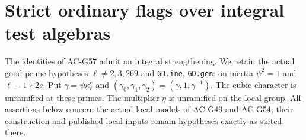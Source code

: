\section{Strict ordinary flags over integral test algebras}
\label{sec:cubic-integral-ordinary}

The identities of AC-G57 admit an integral strengthening.  We
retain the actual good-prime hypotheses $\ell\ne2,3,269$ and
\texttt{GD.ine}, \texttt{GD.gen}: on inertia $\psi^2=1$ and
$\ell-1\nmid2e$.  Put $\gamma=\psi\kappa_\ell^e$ and
$(\gamma_0,\gamma_1,\gamma_2)=(\gamma,1,\gamma^{-1})$.
The cubic character is unramified at these primes.  The
multiplier $\eta$ is unramified on the local group.
All assertions below concern the actual local models of
AC-G49 and AC-G54; their construction and published local
inputs remain hypotheses exactly as stated there.

